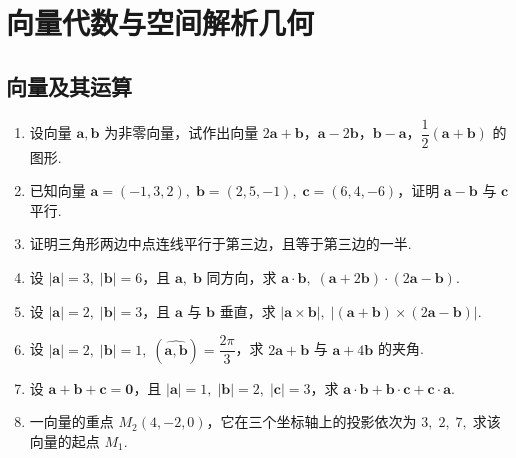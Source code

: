 \chapter{向量代数与空间解析几何}\label{cha:7}

\section{向量及其运算}

\begin{enumerate}\setlength{\itemsep}{7pt}
    \item 设向量 $\boldsymbol{a}, \boldsymbol{b}$ 为非零向量，试作出向量 $2\boldsymbol{a}+\boldsymbol{b}$，$\boldsymbol{a}-2\boldsymbol{b}$，$\boldsymbol{b}-\boldsymbol{a}$，$\dfrac{1}{2}(\boldsymbol{a}+\boldsymbol{b})$ 的图形.
    
    \item 已知向量 $\boldsymbol{a}=(-1, 3, 2),\;\boldsymbol{b}=(2, 5, -1),\;\boldsymbol{c}=(6, 4, -6)$，证明 $\boldsymbol{a}-\boldsymbol{b}$ 与 $\boldsymbol{c}$ 平行.
    
    \item 证明三角形两边中点连线平行于第三边，且等于第三边的一半.
    
    \item 设 $|\boldsymbol{a}|=3,\;|\boldsymbol{b}|=6$，且 $\boldsymbol{a},\;\boldsymbol{b}$ 同方向，求 $\boldsymbol{a}\cdot\boldsymbol{b},\;(\boldsymbol{a}+2\boldsymbol{b})\cdot(2\boldsymbol{a}-\boldsymbol{b})$.
    
    \item 设 $|\boldsymbol{a}|=2,\;|\boldsymbol{b}|=3$，且 $\boldsymbol{a}$ 与 $\boldsymbol{b}$ 垂直，求 $|\boldsymbol{a}\times\boldsymbol{b}|,\;|(\boldsymbol{a}+\boldsymbol{b})\times(2\boldsymbol{a}-\boldsymbol{b})|$.
    
    \item 设 $|\boldsymbol{a}|=2,\;|\boldsymbol{b}|=1,\;(\widehat{\boldsymbol{a}, \boldsymbol{b}})=\dfrac{2\pi}{3}$，求 $2\boldsymbol{a}+\boldsymbol{b}$ 与 $\boldsymbol{a}+4\boldsymbol{b}$ 的夹角.
    
    \item 设 $\boldsymbol{a}+\boldsymbol{b}+\boldsymbol{c}=\boldsymbol{0}$，且 $|\boldsymbol{a}|=1,\;|\boldsymbol{b}|=2,\;|\boldsymbol{c}|=3$，求 $\boldsymbol{a}\cdot\boldsymbol{b}+\boldsymbol{b}\cdot\boldsymbol{c}+\boldsymbol{c}\cdot\boldsymbol{a}$.
    
    \item 一向量的重点 $M_2(4, -2, 0)$，它在三个坐标轴上的投影依次为 $3,\;2,\;7,\;$求该向量的起点 $M_1$.  
    

\end{enumerate}
